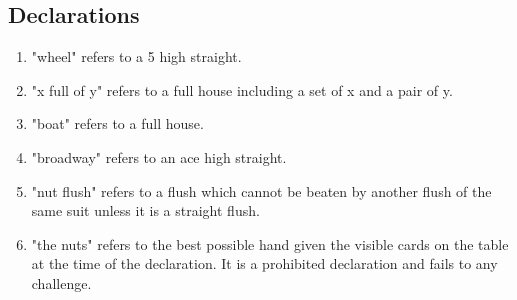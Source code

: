 \documentclass[a4paper,12pt]{article}
\begin{document}
\subsection{Declarations}
\begin{enumerate}
\item "wheel" refers to a 5 high straight.
\item "x full of y" refers to a full house including a set of x and a pair of y.
\item "boat" refers to a full house.
\item "broadway" refers to an ace high straight.
\item "nut flush" refers to a flush which cannot be beaten by another flush of the same suit unless it is a straight flush.
\item "the nuts" refers to the best possible hand given the visible cards on the table at the time of the declaration. It is a prohibited declaration and fails to any challenge.
\end{enumerate}
\end{document}
